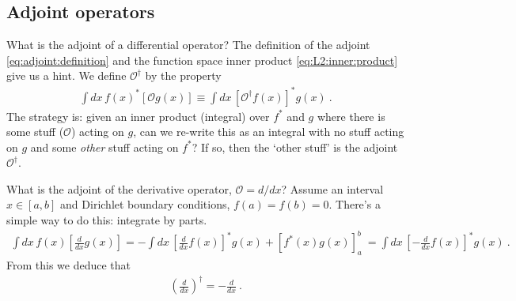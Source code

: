 \subsection{Adjoint operators}

What is the adjoint of a differential operator? The definition of the adjoint \eqref{eq:adjoint:definition} and the function space inner product \eqref{eq:L2:inner:product} give us a hint. We define $\mathcal O^\dag$ by the property
\begin{align}
	\int dx \, f(x)^* \left[\mathcal O g(x)\right]
	\equiv
	\int dx \, \left[\mathcal O^\dag f(x)\right]^*  g(x) \ .
\end{align}
The strategy is: given an inner product (integral) over $f^*$ and $g$ where there is some stuff ($\mathcal O$) acting on $g$, can we re-write this as an integral with no stuff acting on $g$ and some \emph{other} stuff acting on $f^*$? If so, then the `other stuff' is the adjoint $\mathcal O^\dag$.
\begin{example}
What is the adjoint of the derivative operator, $\mathcal O = d/dx$? Assume an interval $x\in[a,b]$ and Dirichlet boundary conditions, $f(a)=f(b)=0$. There's a simple way to do this: integrate by parts.
\begin{align}
	\int dx \,  f(x) \left[\frac{d}{dx} g(x)\right]
	=
	- \int dx \, \left[\frac{d}{dx}f(x)\right]^* g(x)
	+
	\left[f^*(x)g(x)\right]^b_a \ 
	=
	\int dx \, \left[-\frac{d}{dx}f(x)\right]^* g(x)
	\ . 
\end{align}
From this we deduce that
\begin{align}
	\left(\frac{d}{dx}\right)^\dag = -\frac{d}{dx} \ .
\end{align}
\end{example}

